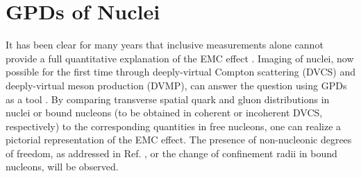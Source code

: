 \section{GPDs of Nuclei}

It has been clear for many years that inclusive measurements alone cannot
provide a 
full quantitative explanation of the EMC
effect \cite{Aubert:1983xm}.
Imaging of nuclei, now possible for the first time
through deeply-virtual Compton scattering (DVCS) and deeply-virtual meson production (DVMP), can answer the question using GPDs as a tool \cite{Dupre:2015jha}.
By comparing transverse spatial quark and gluon distributions in nuclei
or bound nucleons (to be obtained in coherent or incoherent DVCS, respectively) to
the corresponding quantities in free nucleons,
one can realize a pictorial representation of the EMC effect.
The presence of non-nucleonic degrees of freedom, 
as addressed in Ref. \cite{Berger:2001zb},
or the 
change of confinement radii in bound nucleons, will be observed. 

